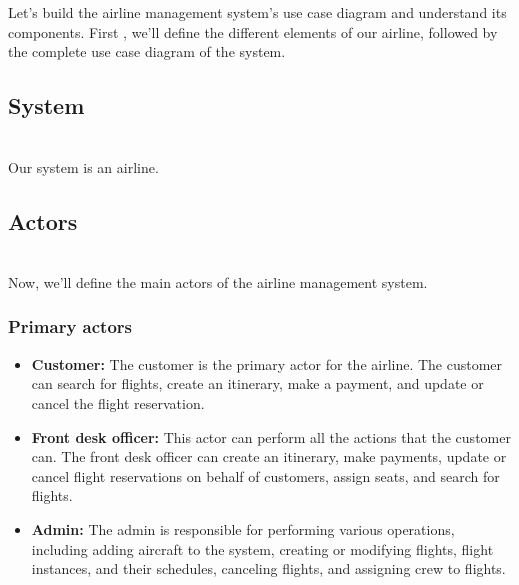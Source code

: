 

Let's build the airline management system's use case diagram and understand its components. First , we'll define the different elements of our airline, followed by the complete use case diagram of the system.

\subsection{System}\label{hMrSN5AggaJIjTh1SKF-6}
\\
Our system is an airline.

\subsection{Actors}\label{bqU86EwizbfXPEUAir9tG}
\\
Now, we'll define the main actors of the airline management system.

\subsubsection{Primary actors}\label{lr0ADAIsAmvAduSikQDzb}

\begin{itemize}
\item
\protect{}\label{Xn0NA5i35dhhbzbJP0l8I}
\textbf{Customer:} The customer is the primary actor for the airline. The customer can search for flights, create an itinerary, make a payment, and update or cancel the flight reservation.
\item
\protect{}\label{6mMZerdKZbjsVHOsXcd57}
\textbf{Front desk officer:} This actor can perform all the actions that the customer can. The front desk officer can create an itinerary, make payments, update or cancel flight reservations on behalf of customers, assign seats, and search for flights.
\item
\protect{}\label{LlH4d0GJhmqiyJoYv79YS}
\textbf{Admin:} The admin is responsible for performing various operations, including adding aircraft to the system, creating or modifying flights, flight instances, and their schedules, canceling flights, and assigning crew to flights.
\end{itemize}

